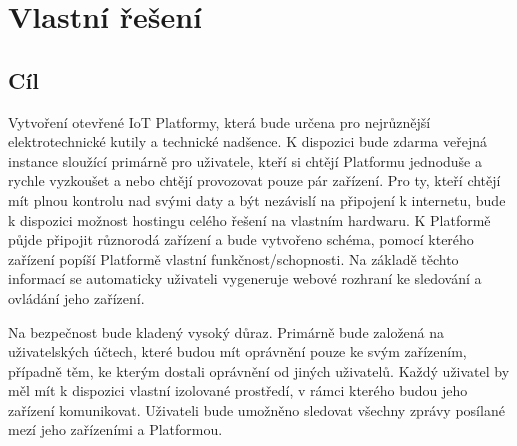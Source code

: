 \section{Vlastní řešení}
\subsection{Cíl}
Vytvoření otevřené IoT Platformy, která bude určena pro nejrůznější elektrotechnické kutily a technické nadšence. K dispozici bude zdarma veřejná instance sloužící primárně pro uživatele, kteří si chtějí Platformu jednoduše a rychle vyzkoušet a nebo chtějí provozovat pouze pár zařízení. Pro ty, kteří chtějí mít plnou kontrolu nad svými daty a být nezávislí na připojení k internetu, bude k dispozici možnost hostingu celého řešení na vlastním hardwaru. K Platformě půjde připojit různorodá zařízení a bude vytvořeno schéma, pomocí kterého zařízení popíší Platformě vlastní funkčnost/schopnosti. Na základě těchto informací se automaticky uživateli vygeneruje webové rozhraní ke sledování a ovládání jeho zařízení.

Na bezpečnost bude kladený vysoký důraz. Primárně bude založená na uživatelských účtech, které budou mít oprávnění pouze ke svým zařízením, případně těm, ke kterým dostali oprávnění od jiných uživatelů. Každý uživatel by měl mít k dispozici vlastní izolované prostředí, v rámci kterého budou jeho zařízení komunikovat. Uživateli bude umožněno sledovat všechny zprávy posílané mezí jeho zařízeními a Platformou.


